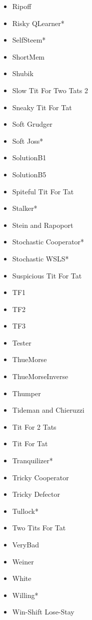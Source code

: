 \begin{appendices}
\begin{multicols}{4}
\begin{itemize}
            \item Ripoff
            \item Risky QLearner*
            \item SelfSteem*
            \item ShortMem
            \item Shubik
            \item Slow Tit For Two Tats 2
            \item Sneaky Tit For Tat
            \item Soft Grudger
            \item Soft Joss*
            \item SolutionB1
            \item SolutionB5
            \item Spiteful Tit For Tat
            \item Stalker*
            \item Stein and Rapoport
            \item Stochastic Cooperator*
            \item Stochastic WSLS*
            \item Suspicious Tit For Tat
            \item TF1
            \item TF2
            \item TF3
            \item Tester
            \item ThueMorse
            \item ThueMorseInverse
            \item Thumper
            \item Tideman and Chieruzzi
            \item Tit For 2 Tats
            \item Tit For Tat
            \item Tranquilizer*
            \item Tricky Cooperator
            \item Tricky Defector
            \item Tullock*
            \item Two Tits For Tat
            \item VeryBad
            \item Weiner
            \item White
            \item Willing*
            \item Win-Shift Lose-Stay

\end{itemize}
\end{multicols}
\end{appendices}
